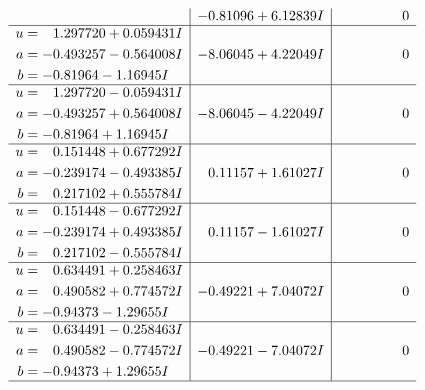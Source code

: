 \documentclass[1p]{elsarticle_modified}
\theoremstyle{definition}
\begin{document}
$$\begin{array}{c|c|c}
 & -0.81096 + 6.12839 I & \phantom{-0.000000 } 0 \\ \hline\begin{aligned}
u &= \phantom{-}1.297720 + 0.059431 I \\
a &= -0.493257 - 0.564008 I \\
b &= -0.81964 - 1.16945 I\end{aligned}
 & -8.06045 + 4.22049 I & \phantom{-0.000000 } 0 \\ \hline\begin{aligned}
u &= \phantom{-}1.297720 - 0.059431 I \\
a &= -0.493257 + 0.564008 I \\
b &= -0.81964 + 1.16945 I\end{aligned}
 & -8.06045 - 4.22049 I & \phantom{-0.000000 } 0 \\ \hline\begin{aligned}
u &= \phantom{-}0.151448 + 0.677292 I \\
a &= -0.239174 - 0.493385 I \\
b &= \phantom{-}0.217102 + 0.555784 I\end{aligned}
 & \phantom{-}0.11157 + 1.61027 I & \phantom{-0.000000 } 0 \\ \hline\begin{aligned}
u &= \phantom{-}0.151448 - 0.677292 I \\
a &= -0.239174 + 0.493385 I \\
b &= \phantom{-}0.217102 - 0.555784 I\end{aligned}
 & \phantom{-}0.11157 - 1.61027 I & \phantom{-0.000000 } 0 \\ \hline\begin{aligned}
u &= \phantom{-}0.634491 + 0.258463 I \\
a &= \phantom{-}0.490582 + 0.774572 I \\
b &= -0.94373 - 1.29655 I\end{aligned}
 & -0.49221 + 7.04072 I & \phantom{-0.000000 } 0 \\ \hline\begin{aligned}
u &= \phantom{-}0.634491 - 0.258463 I \\
a &= \phantom{-}0.490582 - 0.774572 I \\
b &= -0.94373 + 1.29655 I\end{aligned}
 & -0.49221 - 7.04072 I & \phantom{-0.000000 } 0\\
 \hline 
 \end{array}$$\newpage$$\begin{array}{c|c|c}  

\end{array}$$
\end{document}
